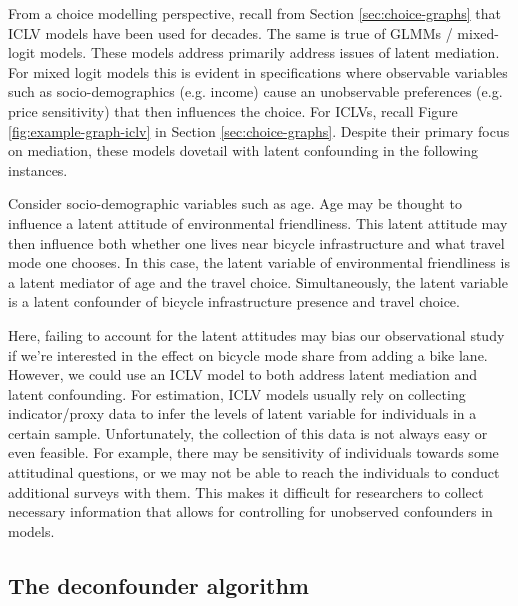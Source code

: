 From a choice modelling perspective, recall from Section \ref{sec:choice-graphs} that ICLV models have been used for decades.
The same is true of GLMMs / mixed-logit models.
These models address primarily address issues of latent mediation.
For mixed logit models this is evident in specifications where observable variables such as socio-demographics (e.g. income) cause an unobservable preferences (e.g. price sensitivity) that then influences the choice.
For ICLVs, recall Figure \ref{fig:example-graph-iclv} in Section \ref{sec:choice-graphs}.
Despite their primary focus on mediation, these models dovetail with latent confounding in the following instances.

Consider socio-demographic variables such as age.
Age may be thought to influence a latent attitude of environmental friendliness.
This latent attitude may then influence both whether one lives near bicycle infrastructure and what travel mode one chooses.
In this case, the latent variable of environmental friendliness is a latent mediator of age and the travel choice.
Simultaneously, the latent variable is a latent confounder of bicycle infrastructure presence and travel choice.

Here, failing to account for the latent attitudes may bias our observational study
if we're interested in the effect on bicycle mode share from adding a bike lane.
However, we could use an ICLV model to both address latent mediation and latent confounding.
For estimation, ICLV models usually rely on collecting indicator/proxy data to infer the levels of latent variable for individuals in a certain sample.
Unfortunately, the collection of this data is not always easy or even feasible.
For example, there may be sensitivity of individuals towards some attitudinal questions, or we may not be able to reach the individuals to conduct additional surveys with them.
This makes it difficult for researchers to collect necessary information that allows for controlling for unobserved confounders in models.

\subsection{The deconfounder algorithm}
\label{sec:deconfounder-algo}

